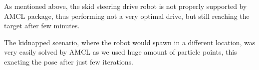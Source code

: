 \documentclass[10pt,journal,compsoc]{IEEEtran}
\begin{document}
    As mentioned above, the skid steering drive robot is not properly supported by AMCL package, thus performing not a very optimal drive, but still reaching the target after few minutes.

    The kidnapped scenario, where the robot would spawn in a different location, was very easily solved by AMCL as we used huge amount of particle points, this exacting the pose after just few iterations.
    
    \nocite{*}
    
    
    

    
\end{document}
